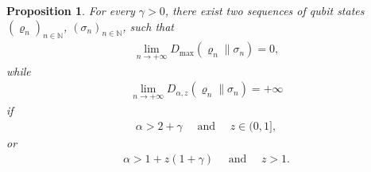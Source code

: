 \documentclass[unsortedaddress,superscriptaddress,pra,notitlepage]{revtex4}
\newtheorem{prop}[definition]{Proposition}
\def\bN{\mathbb{N}}
\def\rho{\varrho}
\newcommand{\ds}{\mbox{ }\mbox{ }}
\begin{document}
\begin{prop}\label{prop:a>2 discont}
For every $\gamma>0$, there exist two sequences of qubit states $(\rho_n)_{n\in\bN}$, 
$(\sigma_n)_{n\in\bN}$, such that 
\begin{align}\label{P-R counter5}
\lim_{n\to+\infty}D_{\max}(\rho_n\|\sigma_n)=0,
\end{align}
while 
\begin{align*}
\lim_{n\to+\infty}D_{\alpha,z}(\rho_n\|\sigma_n)=+\infty
\end{align*}
if
\begin{align}\label{P-R counter3}
\alpha>2+\gamma\ds\text{and}\ds z\in(0,1],
\end{align}
or
\begin{align}\label{P-R counter4}
\alpha>1+z(1+\gamma)\ds\text{and}\ds z>1.
\end{align}
\end{prop}
\end{document}
